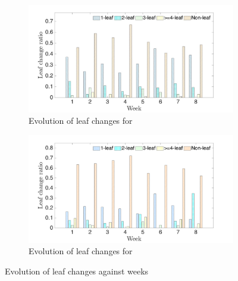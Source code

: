 \documentclass[12pt]{report}	%
\begin{document}
\begin{figure}
\centering
    \begin{subfigure}[t]{0.85\textwidth}
        \centering
        \includegraphics[width=0.95\columnwidth]{images/lt02.pdf}
        \caption{Evolution of leaf changes for \benchf}
        \label{fig:leaf-chg-evol:data1}
    \end{subfigure}%
    
    \begin{subfigure}[t]{0.85\textwidth}
        \centering
        \includegraphics[width=0.95\columnwidth]{images/lt.pdf}
        \caption{Evolution of leaf changes for \benchs}
        \label{fig:leaf-chg-evol:data2}
    \end{subfigure}

    \caption{Evolution of leaf changes against weeks}
    \label{fig:leaf-chg-evol}
\end{figure}
\end{document}
